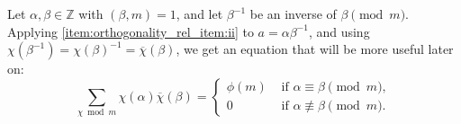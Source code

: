 Let $\alpha,\beta\in\mathbb{Z}$ with $(\beta,m) = 1$, and let $\beta^{-1}$ be an inverse of $\beta \pmod m$. Applying \ref{item:orthogonality_rel_item:ii} to $a = \alpha \beta^{-1}$, and using $\chi(\beta^{-1}) = \chi(\beta)^{-1} = \overline\chi(\beta)$, we get an equation that will be more useful later on:
\begin{equation}\label{eq:orthogonality_rel_special_case}
    \sum_{\chi \bmod m} \chi(\alpha ) \overline\chi(\beta) =\begin{cases}
                \phi(m) &\text{ if } \alpha \equiv \beta \pmod m, \\
                0 &\text{ if } \alpha \not\equiv \beta \pmod m.
            \end{cases}
\end{equation}
